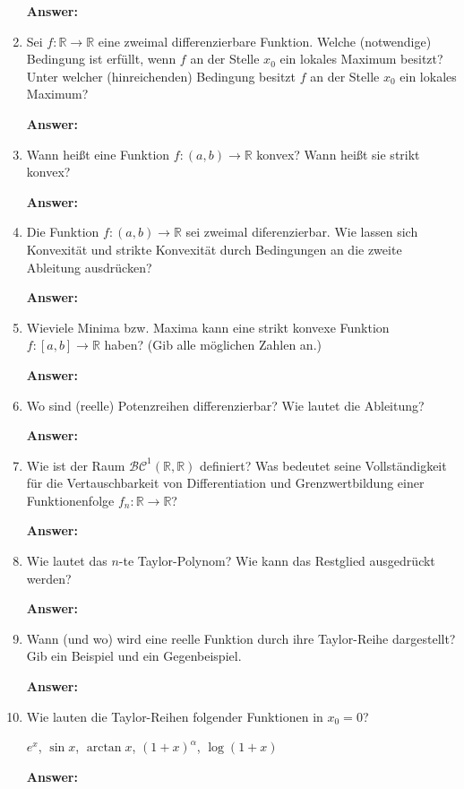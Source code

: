 \documentclass[11pt]{article}
\newcommand{\RR}[0]{\mathbb{R}}
\begin{document}
\begin{enumerate}
    \textbf{Answer:}
    \item Sei $f\colon \RR\to\RR$ eine zweimal differenzierbare Funktion. Welche (notwendige) Bedingung ist erfüllt, wenn $f$ an der Stelle $x_0$ ein lokales Maximum besitzt? Unter welcher (hinreichenden) Bedingung besitzt $f$ an der Stelle $x_0$ ein lokales Maximum?
    
    \textbf{Answer:}
    \item Wann heißt eine Funktion $f\colon (a, b)\to\RR$ konvex? Wann heißt sie strikt konvex?
    
    \textbf{Answer:}
    \item Die Funktion $f\colon (a, b)\to\RR$ sei zweimal diferenzierbar. Wie lassen sich Konvexität
    und strikte Konvexität durch Bedingungen an die zweite Ableitung ausdrücken?

    \textbf{Answer:}
    \item Wieviele Minima bzw. Maxima kann eine strikt konvexe Funktion $f\colon [a,b]\to\RR$ haben? (Gib alle möglichen Zahlen an.)
    
    \textbf{Answer:}
    \item Wo sind (reelle) Potenzreihen differenzierbar? Wie lautet die Ableitung?
    
    \textbf{Answer:}
    \item Wie ist der Raum $\mathcal{BC}^1(\RR,\RR)$ definiert? Was bedeutet seine Vollständigkeit für die Vertauschbarkeit von Differentiation und Grenzwertbildung einer Funktionenfolge $f_n\colon \RR\to\RR$?
    
    \textbf{Answer:}
    \item Wie lautet das $n$-te Taylor-Polynom? Wie kann das Restglied ausgedrückt werden?
    
    \textbf{Answer:}
    \item Wann (und wo) wird eine reelle Funktion durch ihre Taylor-Reihe dargestellt? Gib ein Beispiel und ein Gegenbeispiel.
    
    \textbf{Answer:}
    \item Wie lauten die Taylor-Reihen folgender Funktionen in $x_0 = 0$?
    \begin{center}
        $e^x$, $\sin{x}$, $\arctan{x}$, $(1+x)^\alpha$, $\log(1+x)$
    \end{center}

    \textbf{Answer:}
\end{enumerate}
\end{document}
